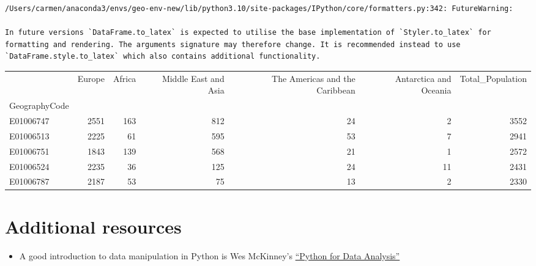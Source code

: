 \documentclass[
  letterpaper,
  DIV=11,
  numbers=noendperiod]{scrreprt}
\providecommand{\tightlist}{%
  \setlength{\itemsep}{0pt}\setlength{\parskip}{0pt}}\usepackage{longtable,booktabs,array}
\begin{document}
\begin{verbatim}
/Users/carmen/anaconda3/envs/geo-env-new/lib/python3.10/site-packages/IPython/core/formatters.py:342: FutureWarning:

In future versions `DataFrame.to_latex` is expected to utilise the base implementation of `Styler.to_latex` for formatting and rendering. The arguments signature may therefore change. It is recommended instead to use `DataFrame.style.to_latex` which also contains additional functionality.
\end{verbatim}

\begin{tabular}{lrrrrrr}
\toprule
{} &  Europe &  Africa &  Middle East and Asia &  The Americas and the Caribbean &  Antarctica and Oceania &  Total\_Population \\
GeographyCode &         &         &                       &                                 &                         &                   \\
\midrule
E01006747     &    2551 &     163 &                   812 &                              24 &                       2 &              3552 \\
E01006513     &    2225 &      61 &                   595 &                              53 &                       7 &              2941 \\
E01006751     &    1843 &     139 &                   568 &                              21 &                       1 &              2572 \\
E01006524     &    2235 &      36 &                   125 &                              24 &                      11 &              2431 \\
E01006787     &    2187 &      53 &                    75 &                              13 &                       2 &              2330 \\
\bottomrule
\end{tabular}

\section*{Additional resources}\label{additional-resources}


\begin{itemize}
\tightlist
\item
  A good introduction to data manipulation in Python is Wes McKinney's
  \href{https://wesmckinney.com/book/}{``Python for Data Analysis''}
\end{itemize}
\end{document}
